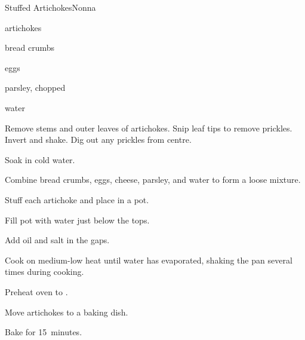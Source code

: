 \begin{recipe}{Stuffed Artichokes}{Nonna}{}

\begin{ingredients}
\item artichokes
\item bread crumbs
\item eggs
\item {}
\item parsley, chopped
\item water
\end{ingredients}

\begin{directions}
\item Remove stems and outer leaves of artichokes. Snip leaf tips to remove prickles. Invert and shake. Dig out any prickles from centre.
\item Soak in cold water.
\item Combine bread crumbs, eggs, cheese, parsley, and water to form a loose mixture.
\item Stuff each artichoke and place in a pot.
\item Fill pot with water just below the tops.
\item Add oil and salt in the gaps.
\item Cook on medium-low heat until water has evaporated, shaking the pan several times during cooking.
\item Preheat oven to .
\item Move artichokes to a baking dish.
\item Bake for 15~minutes.
\end{directions}

\end{recipe}
